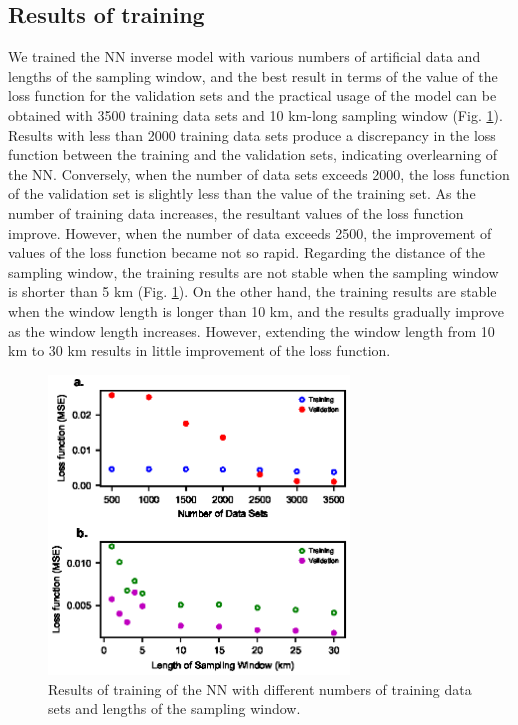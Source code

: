 \subsection{Results of training}
We trained the NN inverse model with various numbers of artificial data and lengths of the sampling window, and the best result in terms of the value of the loss function for the validation sets and the practical usage of the model can be obtained with 3500 training data sets and 10 km-long sampling window  (Fig. \ref{fig:training_different_number_length}). Results with less than 2000 training data sets produce a discrepancy in the loss function between the training and the validation sets, indicating overlearning of the NN. Conversely, when the number of data sets exceeds 2000, the loss function of the validation set is slightly less than the value of the training set. As the number of training data increases, the resultant values of the loss function improve. However, when the number of data exceeds 2500, the improvement of values of the loss function became not so rapid. Regarding the distance of the sampling window, the training results are not stable when the sampling window is shorter than 5 km (Fig. \ref{fig:training_different_number_length}). On the other hand, the training results are stable when the window length is longer than 10 km, and the results gradually improve as the window length increases. However, extending the window length from 10 km to 30 km results in little improvement of the loss function. 

\begin{figure}[t]
  \includegraphics[width=8cm]{fig05.eps}
  \caption{Results of training of the NN with different numbers of training data sets and lengths of the sampling window.}
  \label{fig:training_different_number_length}
\end{figure}

